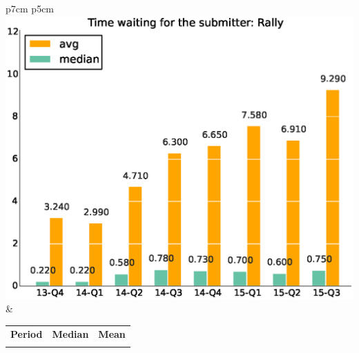 \documentclass[a4wide,11pt]{article}
\begin{document}
\begin{tabular}{p{7cm} p{5cm}}
    \vspace{0pt} 
    \includegraphics[scale=.35]{figs/waiting4submitter_avgRally.eps}
    & 
    \vspace{0pt}
    \begin{tabular}{l|r|r|}%
    \bfseries Period & \bfseries Median & \bfseries Mean %
    \csvreader[head to column names]{data/timewaiting4submitter_medianRally.csv}{}%
    {\\ & \mediantime & \meantime}
    \end{tabular}
\end{tabular}
\end{document}
